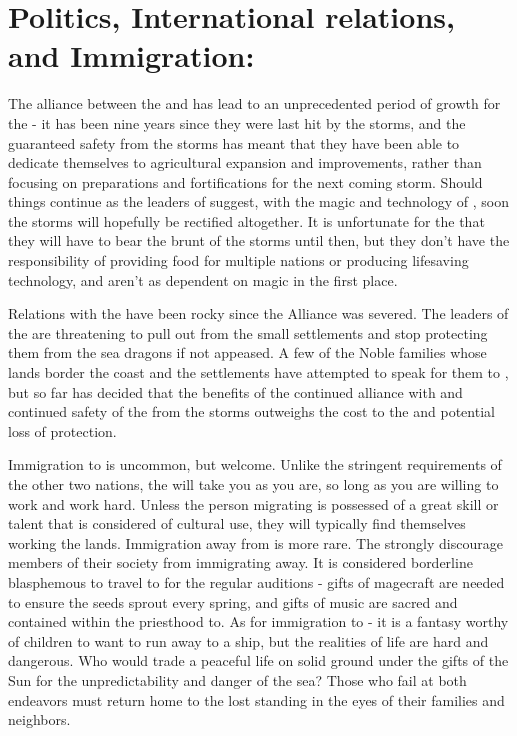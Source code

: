 \documentclass[blue]{GL2020}
\begin{document}
\section*{Politics, International relations, and Immigration:}

The alliance between the \pFarm{} and \pTech{} has lead to an unprecedented period of growth for the \pFarmers{} - it has been nine years since they were last hit by the storms, and the guaranteed safety from the storms has meant that they have been able to dedicate themselves to agricultural expansion and improvements, rather than focusing on preparations and fortifications for the next coming storm.  Should things continue as the leaders of \pTech{} suggest, with the magic and technology of \pTech{}, soon the storms will hopefully be rectified altogether.  It is unfortunate for the \pShip{} that they will have to bear the brunt of the storms until then, but they don't have the responsibility of providing food for multiple nations or producing lifesaving technology, and aren't as dependent on magic in the first place.

Relations with the \pShip{} have been rocky since the Alliance was severed.  The leaders of the \pShip{} are threatening to pull out from the small settlements and stop protecting them from the sea dragons if not appeased.  A few of the Noble families whose lands border the coast and the \pShip{} settlements have attempted to speak for them to \cQueen{}, but so far \cQueen{\they} has decided that the benefits of the continued alliance with \pTechies{} and continued safety of the \pFarm{} from the storms outweighs the cost to the \pShip{} and potential loss of protection.


Immigration to \pFarm{} is uncommon, but welcome.  Unlike the stringent requirements of the other two nations, the \pFarm{} will take you as you are, so long as you are willing to work and work hard.  Unless the person migrating is possessed of a great skill or talent that is considered of cultural use, they will typically find themselves working the lands.  Immigration away from \pFarm{} is more rare.  The \pFarmers{} strongly discourage members of their society from immigrating away.  It is considered borderline blasphemous to travel to \pTech{} for the regular auditions - gifts of magecraft are needed to ensure the seeds sprout every spring, and gifts of music are sacred and contained within the priesthood to.  As for immigration to \pShip{} - it is a fantasy worthy of children to want to run away to a \pShippies{} ship, but the realities of \pShip{} life are hard and dangerous.  Who would trade a peaceful life on solid ground under the gifts of the Sun for the unpredictability and danger of the sea?  Those who fail at both endeavors must return home to the lost standing in the eyes of their families and neighbors.
\end{document}
